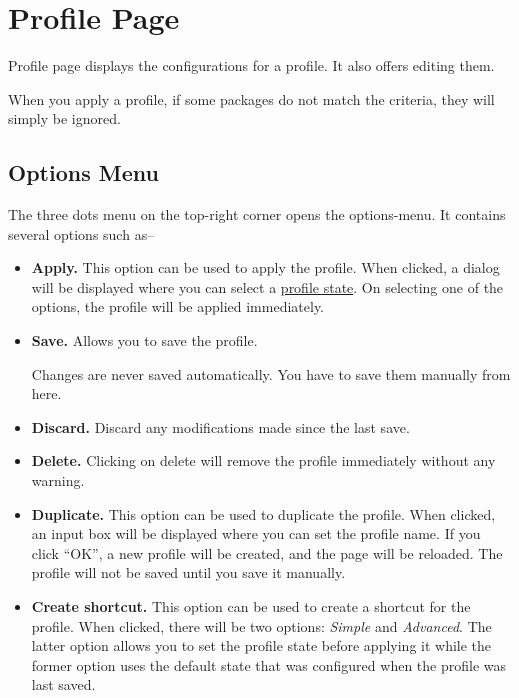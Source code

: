 \section{Profile Page}\label{sec:profile-page}
Profile page displays the configurations for a profile. It also offers editing them.

\begin{tip}[Notice]
    When you apply a profile, if some packages do not match the criteria, they will simply be ignored.
\end{tip}

\subsection{Options Menu}\label{subsec:profile-options-menu}
The three dots menu on the top-right corner opens the options-menu. It contains several options such as--
\begin{itemize}
    \item \textbf{Apply.} This option can be used to apply the profile. When clicked, a dialog will be displayed where
    you can select a \hyperref[subsubsec:profile-state]{profile state}. On selecting one of the options, the profile
    will be applied immediately.
    \item \textbf{Save.} Allows you to save the profile.
    \begin{warning}[Notice]
        Changes are never saved automatically. You have to save them manually from here.
    \end{warning}
    \item \textbf{Discard.} Discard any modifications made since the last save.
    \item \textbf{Delete.} Clicking on delete will remove the profile immediately without any warning.
    \item \textbf{Duplicate.} This option can be used to duplicate the profile. When clicked, an input box will be
    displayed where you can set the profile name. If you click ``OK'', a new profile will be created, and the page will be
    reloaded. The profile will not be saved until you save it manually.
    \item \textbf{Create shortcut.} This option can be used to create a shortcut for the profile. When clicked, there
    will be two options: \textit{Simple} and \textit{Advanced}. The latter option allows you to set the profile state
    before applying it while the former option uses the default state that was configured when the profile was last saved.
\end{itemize}

